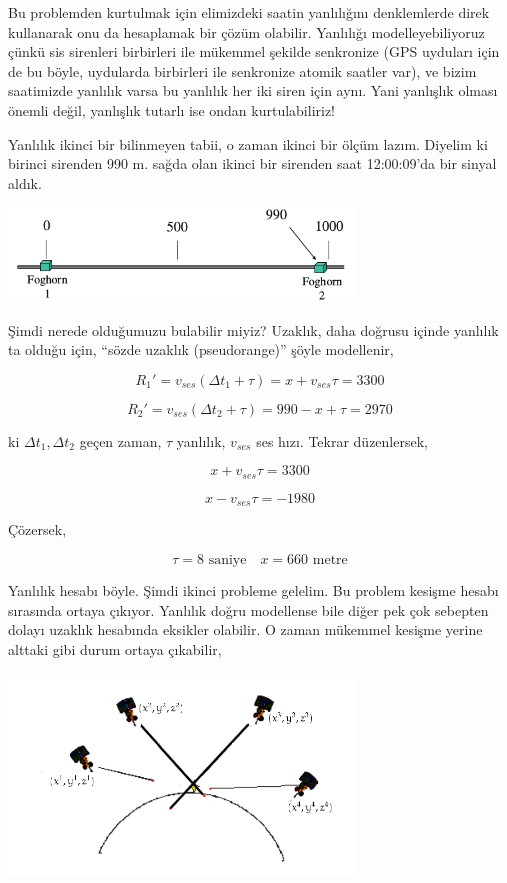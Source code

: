 \documentclass[12pt,fleqn]{article}\usepackage{../../common}
\begin{document}
Bu problemden kurtulmak için elimizdeki saatin yanlılığını denklemlerde
direk kullanarak onu da hesaplamak bir çözüm olabilir. Yanlılığı
modelleyebiliyoruz çünkü sis sirenleri birbirleri ile mükemmel şekilde
senkronize (GPS uyduları için de bu böyle, uydularda birbirleri ile
senkronize atomik saatler var), ve bizim saatimizde yanlılık varsa bu
yanlılık her iki siren için aynı. Yani yanlışlık olması önemli değil,
yanlışlık tutarlı ise ondan kurtulabiliriz!

Yanlılık ikinci bir bilinmeyen tabii, o zaman ikinci bir ölçüm
lazım. Diyelim ki birinci sirenden 990 m. sağda olan ikinci bir sirenden
saat 12:00:09'da bir sinyal aldık.

\includegraphics[width=25em]{foghorn2.png}

Şimdi nerede olduğumuzu bulabilir miyiz?  Uzaklık, daha doğrusu içinde
yanlılık ta olduğu için, ``sözde uzaklık (pseudorange)'' şöyle modellenir,

$$ R_1' = v_{ses} (\Delta t_1 + \tau ) = x + v_{ses}\tau = 3300 $$

$$ R_2' = v_{ses} (\Delta t_2 + \tau ) = 990 - x + \tau = 2970$$

ki $\Delta t_1, \Delta t_2$ geçen zaman, $\tau$ yanlılık, $v_{ses}$ ses
hızı. Tekrar düzenlersek, 

$$ x + v_{ses} \tau = 3300$$

$$ x - v_{ses} \tau = -1980  $$

Çözersek, 

$$ \tau = 8 \textrm{ saniye} \quad x = 660 \textrm{ metre}$$

Yanlılık hesabı böyle. Şimdi ikinci probleme gelelim. Bu problem kesişme
hesabı sırasında ortaya çıkıyor. Yanlılık doğru modellense bile diğer pek
çok sebepten dolayı uzaklık hesabında eksikler olabilir. O zaman mükemmel
kesişme yerine alttaki gibi durum ortaya çıkabilir,

\includegraphics[width=25em]{trilat2.png}
\end{document}

